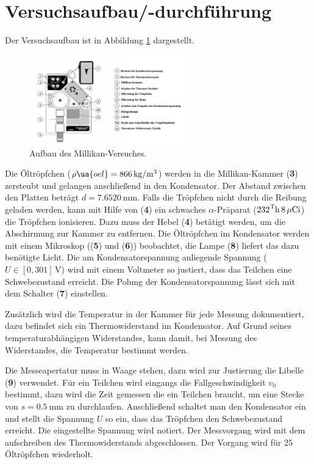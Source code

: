 \section{Versuchsaufbau/-durchführung}

Der Versuchsaufbau ist in Abbildung \ref{fig: versuchsaufabu} dargestellt.
\begin{figure}
  \centering
  \includegraphics[width=0.6\textwidth]{pics/aufbau.png}
  \caption{Aufbau des Millikan-Versuches\cite{anleitung503}.}
  \label{fig: versuchsaufabu}
  \end{figure}
Die Öltröpfchen ($\rho\ua{oel}=\SI{866}{\kilogram\per\cubic\meter}$) werden in die Millikan-Kammer (\textbf{3}) zersteubt
und gelangen anschließend in den Kondensator. Der Abstand zwischen den Platten beträgt $d=\SI{7.6520}{\milli\meter}$.
Falls die Tröpfchen nicht durch die
Reibung geladen werden, kann mit Hilfe von (\textbf{4}) ein schwaches
$\alpha$-Präparat ($\ce{{232}^Th}\,8\,\mu\ce{Ci}$) die Tröpfchen ionisieren. Dazu
muss der Hebel (\textbf{4}) betätigt werden, um die Abschirmung zur Kammer
zu entfernen.
Die Öltröpfchen im Kondensator werden mit einem Mikroskop ((\textbf{5}) und (\textbf{6})) beobachtet,
die Lampe (\textbf{8}) liefert das dazu benötigte Licht.
Die am Kondensatorspannung anliegende Spannung ($U\in\left[0,301\right]\,\si{\volt}$) %
wird mit einem Voltmeter so justiert, dass das Teilchen eine Schwebezustand erreicht. %
Die Polung der Kondensatorspannung lässt sich mit dem Schalter (\textbf{7}) einstellen.

Zusätzlich wird die Temperatur in der Kammer für jede Messung dokumentiert, dazu befindet sich
ein Thermowiderstand im Kondensator. Auf Grund seines temperaturabhängigen Widerstandes, kann
damit, bei Messung des Widerstandes, die Temperatur bestimmt werden. %

Die Messeapertatur muss in Waage stehen, dazu wird zur Justierung die %
Libelle (\textbf{9}) verwendet.
Für ein Teilchen wird eingangs die Fallgeschwindigkeit $v_0$ bestimmt, dazu
wird die Zeit gemessen die ein Teilchen braucht, um eine Stecke von $s=\SI{0.5}{\milli\meter}$
zu durchlaufen. Anschließend schaltet man den Kondensator ein und stellt die Spannung
$U$ so ein, dass das Tröpfchen den Schwebezustand erreicht. Die eingestellte %
Spannung wird notiert. Der Messvorgang wird mit dem aufschreiben des Thermowiderstands %
abgeschlossen. Der Vorgang wird für 25 Öltröpfchen wiederholt.
